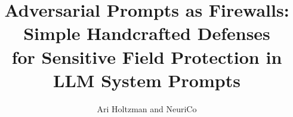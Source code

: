 \documentclass{article}
\title{Adversarial Prompts as Firewalls: Simple Handcrafted Defenses\\for Sensitive Field Protection in LLM System Prompts}
\author{Ari Holtzman and NeuriCo}
\begin{document}
\maketitle

\begin{abstract}

\end{abstract}










\end{document}

